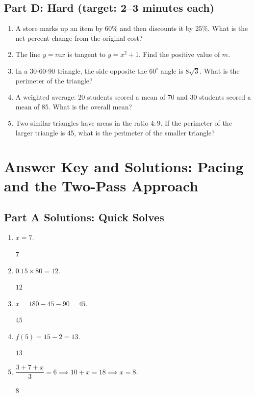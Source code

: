 \documentclass[14pt]{extarticle}
\begin{document}
\subsection*{Part D: Hard (target: 2--3 minutes each)}
\begin{enumerate}
  \item A store marks up an item by \(60\%\) and then discounts it by \(25\%\). What is the net percent change from the original cost?
  \item The line \(y = mx\) is tangent to \(y = x^2 + 1\). Find the positive value of \(m\).
  \item In a 30-60-90 triangle, the side opposite the \(60^\circ\) angle is \(8\sqrt{3}\). What is the perimeter of the triangle?
  \item A weighted average: 20 students scored a mean of 70 and 30 students scored a mean of 85. What is the overall mean?
  \item Two similar triangles have areas in the ratio \(4:9\). If the perimeter of the larger triangle is 45, what is the perimeter of the smaller triangle?
\end{enumerate}

\newpage

\section*{Answer Key and Solutions: Pacing and the Two-Pass Approach}

\subsection*{Part A Solutions: Quick Solves}
\begin{enumerate}
  \item \(x = 7\).

  \(\boxed{7}\)

  \item \(0.15 \times 80 = 12\).

  \(\boxed{12}\)

  \item \(x = 180 - 45 - 90 = 45\).

  \(\boxed{45}\)

  \item \(f(5) = 15 - 2 = 13\).

  \(\boxed{13}\)

  \item \(\dfrac{3 + 7 + x}{3} = 6 \implies 10 + x = 18 \implies x = 8\).

  \(\boxed{8}\)
\end{enumerate}
\end{document}
